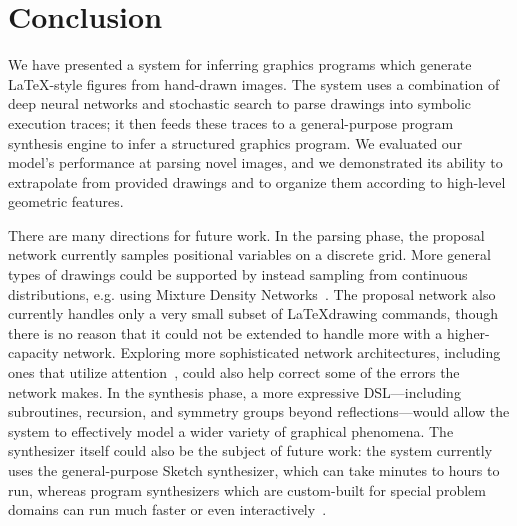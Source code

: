 \documentclass{article}
\newcommand{\remark}[1]{\textcolor{red}{[#1]}}
\begin{document}


\section{Conclusion}

We have presented a system for inferring graphics programs which generate \LaTeX-style figures from hand-drawn images. The system uses a combination of deep neural networks and stochastic search to parse drawings into symbolic execution traces; it then feeds these traces to a general-purpose program synthesis engine to infer a structured graphics program. We evaluated our model's performance at parsing novel images, and we demonstrated its ability to extrapolate from provided drawings and to organize them according to high-level geometric features.

There are many directions for future work. In the parsing phase, the proposal network currently samples positional variables on a discrete grid. More general types of drawings could be supported by instead sampling from continuous distributions, e.g. using Mixture Density Networks~\cite{MDN}. The proposal network also currently handles only a very small subset of \LaTeX drawing commands, though there is no reason that it could not be extended to handle more with a higher-capacity network. Exploring more sophisticated network architectures, including ones that utilize attention~\cite{mnih2014recurrent}, could also help correct some of the errors the network makes.
In the synthesis phase, a more expressive DSL---including subroutines, recursion, and symmetry groups beyond reflections---would allow the system to effectively model a wider variety of graphical phenomena. The synthesizer itself could also be the subject of future work: the system currently uses the general-purpose Sketch synthesizer, which can take minutes to hours to run, whereas program synthesizers which are custom-built for special problem domains can run much faster or even interactively~\cite{le2014flashextract}.
\end{document}
